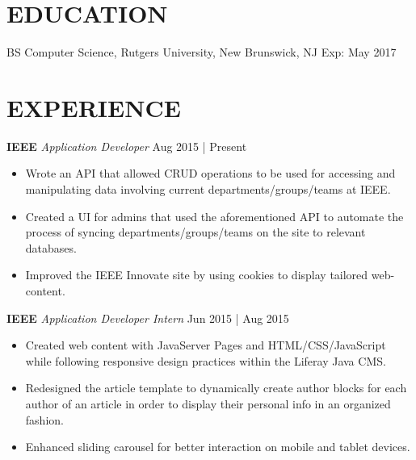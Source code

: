 \documentclass[line,margin]{res}
\begin{document}
    \address{Metuchen, NJ 08840 | (732)-476-8719 | saad@saadquadri.com}

    \begin{resume}

      \vspace{-5mm}

      \section{EDUCATION}
          BS Computer Science, Rutgers University, New Brunswick, NJ \hfill Exp: May 2017

      \section{EXPERIENCE}
          {\textbf{IEEE} \sl  Application Developer} \hfill  Aug 2015 | Present
          \vspace{1.75mm}
          \begin{itemize} \itemsep 3pt
              \item Wrote an API that allowed CRUD operations to be used for accessing and manipulating data involving current departments/groups/teams at IEEE.
              \item Created a UI for admins that used the aforementioned API to automate the process of syncing departments/groups/teams on the site to relevant databases.
              \item Improved the IEEE Innovate site by using cookies to display tailored web-content.
          \end{itemize}

          {\textbf{IEEE} \sl  Application Developer Intern} \hfill  Jun 2015 | Aug 2015
          \vspace{1.75mm}
          \begin{itemize} \itemsep 3pt
              \item Created web content with JavaServer Pages and HTML/CSS/JavaScript while following responsive design practices within the Liferay Java CMS.
              \item Redesigned the article template to dynamically create author blocks for each author of an article in order to display their personal info in an organized fashion.
              \item Enhanced sliding carousel for better interaction on mobile and tablet devices.
          \end{itemize}


\end{resume}
\end{document}
